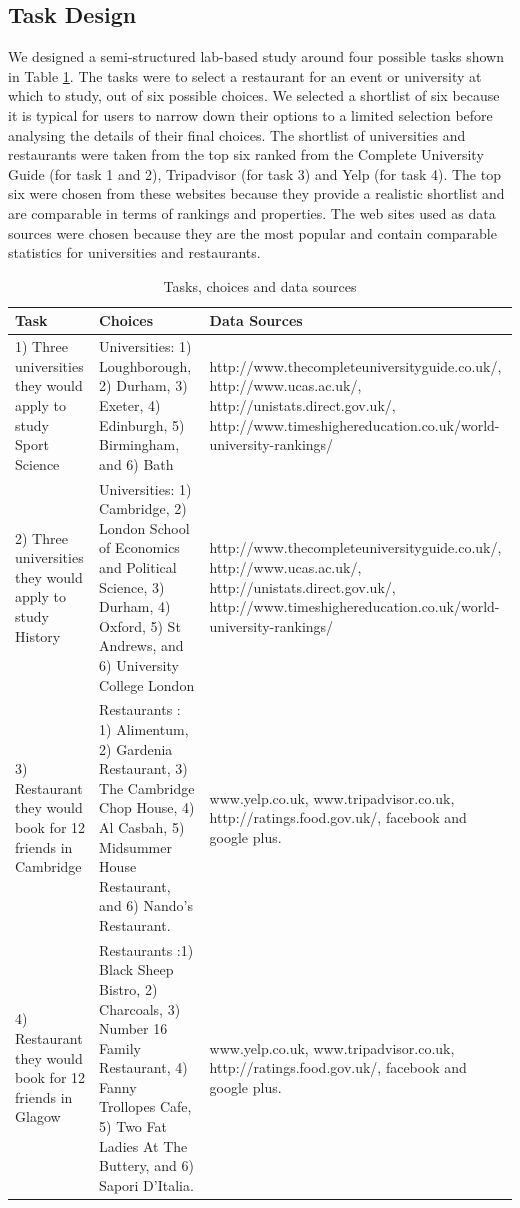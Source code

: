\documentclass{sigchi}
\begin{document}
\subsection{Task Design}
We designed a semi-structured lab-based study around four possible tasks shown in Table \ref{tab:studyfactors}.  The tasks were to select a restaurant for an event or university at which to study, out of six possible choices. We selected a shortlist of six because it is typical for users to narrow down their options to a limited selection before analysing the details of their final choices. The shortlist of universities and restaurants were taken from the top six ranked from the Complete University Guide (for task 1 and 2), Tripadvisor (for task 3) and Yelp (for task 4).  The top six were chosen from these websites because they provide a realistic shortlist and are comparable in terms of rankings and properties. The web sites used as data sources were chosen because they are the most popular and contain comparable statistics for universities and restaurants.

\begin{table}[t]
\begin{center}
\small
\begin{tabular}{|p{4cm}|p{6cm}|p{6cm}|}
\hline
Task	 &Choices	&Data Sources\\
\hline
1) Three universities they would apply to study Sport Science & Universities: 1) Loughborough,  2) Durham,  3) Exeter, 4) Edinburgh, 5) Birmingham, and 6) Bath & http://www.thecompleteuniversityguide.co.uk/, http://www.ucas.ac.uk/, http://unistats.direct.gov.uk/, http://www.timeshighereducation.co.uk/world-university-rankings/ \\
\hline
2) Three universities they would apply to study History & Universities: 1) Cambridge, 2) London School of Economics and Political Science, 3) Durham, 4) Oxford, 5) St Andrews, and 6) University College London & http://www.thecompleteuniversityguide.co.uk/, http://www.ucas.ac.uk/, http://unistats.direct.gov.uk/, http://www.timeshighereducation.co.uk/world-university-rankings/ \\
\hline
3) Restaurant they would book for 12 friends in Cambridge&Restaurants : 1) Alimentum, 2) Gardenia Restaurant, 3) The Cambridge Chop House, 4) Al Casbah, 5) Midsummer House Restaurant, and 6) Nando's Restaurant. & www.yelp.co.uk, www.tripadvisor.co.uk, http://ratings.food.gov.uk/, facebook and google plus.\\
\hline
4) Restaurant they would book for 12 friends in Glagow & Restaurants :1) Black Sheep Bistro, 2) Charcoals, 3) Number 16 Family Restaurant, 4) Fanny Trollopes Cafe, 5) Two Fat Ladies At The Buttery, and 6) Sapori D'Italia. & www.yelp.co.uk, www.tripadvisor.co.uk, http://ratings.food.gov.uk/, facebook and google plus.\\
\hline
\end{tabular}
\end{center}
\caption{Tasks, choices and data sources} \label{tab:studyfactors}
\normalsize
\end{table}%
\end{document}
